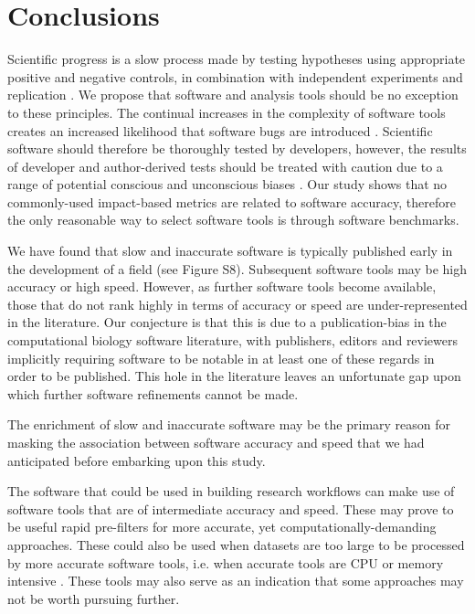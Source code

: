 \documentclass[fleqn,10pt]{SelfArx} %
\begin{document}
\section*{Conclusions}
Scientific progress is a slow process made by testing hypotheses using
appropriate positive and negative controls, in combination with
independent experiments and replication
\cite{Ioannidis2005-xh,Moonesinghe2007-kk}. We propose that software
and analysis tools should be no exception to these principles. The
continual increases in the complexity of software tools creates an
increased likelihood that software bugs are introduced
\cite{Darriba2015-sz}. Scientific software should therefore be
thoroughly tested by developers, however, the results of developer and
author-derived tests should be treated with caution due to a range of
potential conscious and unconscious biases \cite{Norel2011-cq}. Our
study shows that no commonly-used impact-based metrics are related to
software accuracy, therefore the only reasonable way to select
software tools is through software benchmarks.

We have found that slow and inaccurate software is typically published
early in the development of a field (see Figure S8). Subsequent
software tools may be high accuracy or high speed. However, as further
software tools become available, those that do not rank highly in
terms of accuracy or speed are under-represented in the
literature. Our conjecture is that this is due to a publication-bias
in the computational biology software literature, with publishers, editors
and reviewers implicitly requiring software to be notable in at least
one of these regards in order to be published. This hole in the
literature leaves an unfortunate gap upon which further software
refinements cannot be made.

The enrichment of slow and inaccurate software may be the primary
reason for masking the association between software accuracy and speed
that we had anticipated before embarking upon this study.

The software that could be used in building research workflows can
make use of software tools that are of intermediate accuracy and
speed. These may prove to be useful rapid pre-filters for more
accurate, yet computationally-demanding approaches. These could also
be used when datasets are too large to be processed by more accurate
software tools, i.e. when accurate tools are CPU or memory intensive
\cite{Lowe1997-hq,Weinberg2006-tm}. These tools may also serve as an
indication that some approaches may not be worth pursuing further.
\end{document}

